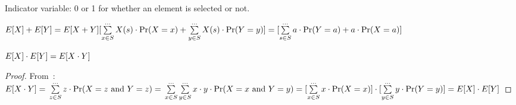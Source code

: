 \begin{definition}
    Indicator variable: 0 or 1 for whether an element is selected or not.
\end{definition}


\begin{definition}\label{lin_expect}
    $ E[X] + E[Y] = E[X + Y] \newline
    [\sum\limits_{x \in S}^{\dots} X(s) \cdot \Pr(X = x) +
    \sum\limits_{y \in S}^{\dots} X(s) \cdot \Pr(Y = y) ] \newline
    = [\sum\limits_{s \in S}^{\dots} a \cdot \Pr(Y = a) + a \cdot \Pr(X = a) ]
    $
\end{definition}

\begin{theorem}
    $ \newline E[X] \cdot E[Y] = E[X \cdot Y]$
\end{theorem}
\begin{proof}
    From~: \newline
    $
    E[X \cdot Y] = \newline \sum\limits_{z \in S}^{\dots} z \cdot 
        \Pr(X = z \text{ and } Y = z) = \newline
    \sum\limits_{x \in S}^{\dots}\sum\limits_{y \in S}^{\dots} x \cdot y
    \cdot \Pr(X = x \text{ and } Y=y) = \newline
    [\sum\limits_{x \in S}^{\dots} x \cdot \Pr(X = x)] \cdot  
    [\sum\limits_{y \in S}^{\dots} y \cdot \Pr(Y = y)]  = \newline
    E[X] \cdot E[Y]
    $
\end{proof}
